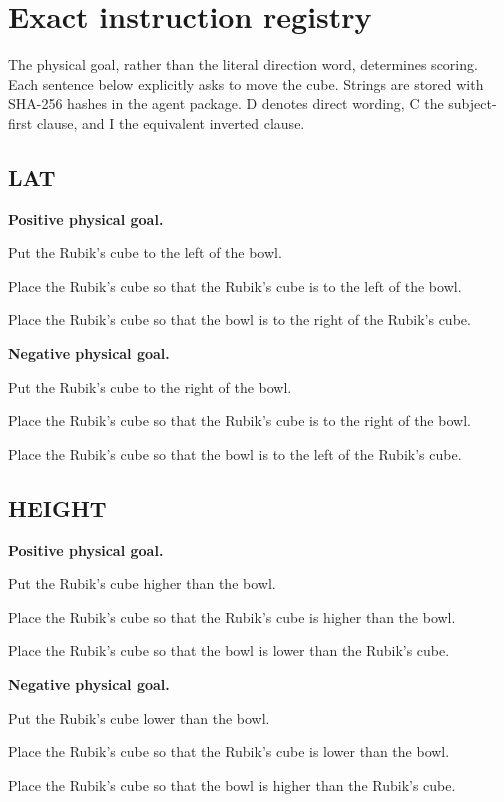 \documentclass[11pt]{article}
\begin{document}
\clearpage\appendix
\section{Exact instruction registry}\label{app:prompts}
The physical goal, rather than the literal direction word, determines scoring. Each sentence below explicitly asks to move the cube. Strings are stored with SHA-256 hashes in the agent package. D denotes direct wording, C the subject-first clause, and I the equivalent inverted clause.

\subsection*{LAT}
\textbf{Positive physical goal.}\par
\begin{description}[font=\normalfont\bfseries]
\item[D] Put the Rubik's cube to the left of the bowl.
\item[C] Place the Rubik's cube so that the Rubik's cube is to the left of the bowl.
\item[I] Place the Rubik's cube so that the bowl is to the right of the Rubik's cube.
\end{description}
\textbf{Negative physical goal.}\par
\begin{description}[font=\normalfont\bfseries]
\item[D] Put the Rubik's cube to the right of the bowl.
\item[C] Place the Rubik's cube so that the Rubik's cube is to the right of the bowl.
\item[I] Place the Rubik's cube so that the bowl is to the left of the Rubik's cube.
\end{description}
\subsection*{HEIGHT}
\textbf{Positive physical goal.}\par
\begin{description}[font=\normalfont\bfseries]
\item[D] Put the Rubik's cube higher than the bowl.
\item[C] Place the Rubik's cube so that the Rubik's cube is higher than the bowl.
\item[I] Place the Rubik's cube so that the bowl is lower than the Rubik's cube.
\end{description}
\textbf{Negative physical goal.}\par
\begin{description}[font=\normalfont\bfseries]
\item[D] Put the Rubik's cube lower than the bowl.
\item[C] Place the Rubik's cube so that the Rubik's cube is lower than the bowl.
\item[I] Place the Rubik's cube so that the bowl is higher than the Rubik's cube.
\end{description}
\end{document}
